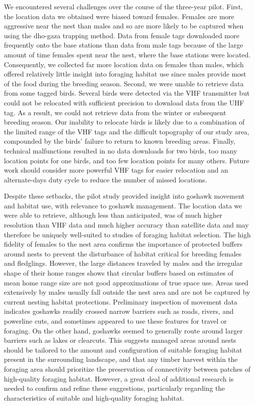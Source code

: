 \documentclass{sfuthesis}
\begin{document}
We encountered several challenges over the course of the three-year pilot. First, the location data we obtained were biased toward females. Females are more aggressive near the nest than males and so are more likely to be captured when using the dho-gaza trapping method. Data from female tags downloaded more frequently onto the base stations than data from male tags because of the large amount of time females spent near the nest, where the base stations were located. Consequently, we collected far more location data on females than males, which offered relatively little insight into foraging habitat use since males provide most of the food during the breeding season. Second, we were unable to retrieve data from some tagged birds. Several birds were detected via the VHF transmitter but could not be relocated with sufficient precision to download data from the UHF tag. As a result, we could not retrieve data from the winter or subsequent breeding season. Our inability to relocate birds is likely due to a combination of the limited range of the VHF tags and the difficult topography of our study area, compounded by the birds' failure to return to known breeding areas. Finally, technical malfunctions resulted in no data downloads for two birds, too many location points for one birds, and too few location points for many others. Future work should consider more powerful VHF tags for easier relocation and an alternate-days duty cycle to reduce the number of missed locations.

Despite these setbacks, the pilot study provided insight into goshawk movement and habitat use, with relevance to goshawk management. The location data we were able to retrieve, although less than anticipated, was of much higher resolution than VHF data and much higher accuracy than satellite data and may therefore be uniquely well-suited to studies of foraging habitat selection. The high fidelity of females to the nest area confirms the importance of protected buffers around nests to prevent the disturbance of habitat critical for breeding females and fledglings. However, the large distances traveled by males and the irregular shape of their home ranges shows that circular buffers based on estimates of mean home range size are not good approximations of true space use. Areas used extensively by males usually fall outside the nest area and are not be captured by current nesting habitat protections. Preliminary inspection of movement data indicates goshawks readily crossed narrow barriers such as roads, rivers, and powerline cuts, and sometimes appeared to use these features for travel or foraging. On the other hand, goshawks seemed to generally route around larger barriers such as lakes or clearcuts. This suggests managed areas around nests should be tailored to the amount and configuration of suitable foraging habitat present in the surrounding landscape, and that any timber harvest within the foraging area should prioritize the preservation of connectivity between patches of high-quality foraging habitat. However, a great deal of additional research is needed to confirm and refine these suggestions, particularly regarding the characteristics of suitable and high-quality foraging habitat.
\end{document}
